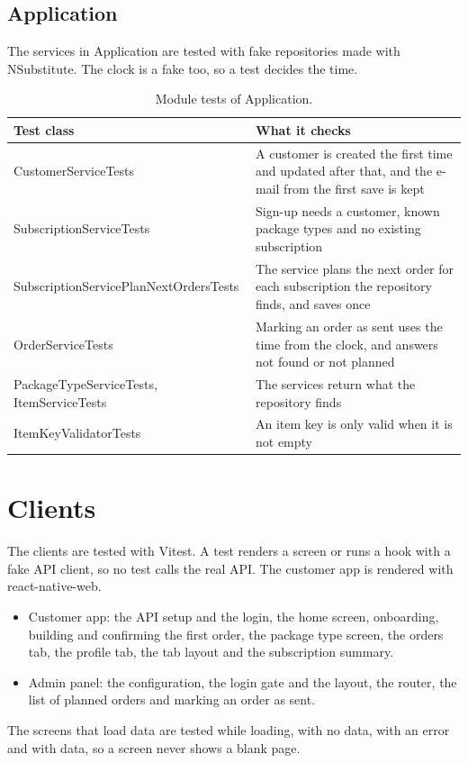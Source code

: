 \documentclass[a4paper,11pt]{article}
\begin{document}
\subsection{Application}
The services in Application are tested with fake repositories made with NSubstitute. The clock is a fake too, so a test decides the time.

\begin{table}[H]
\centering
\small
\begin{tabular}{@{}p{7.1cm}p{7.1cm}@{}}
\hline
\textbf{Test class} & \textbf{What it checks} \\
\hline
CustomerServiceTests & A customer is created the first time and updated after that, and the e-mail from the first save is kept \\
SubscriptionServiceTests & Sign-up needs a customer, known package types and no existing subscription \\
SubscriptionServicePlanNextOrdersTests & The service plans the next order for each subscription the repository finds, and saves once \\
OrderServiceTests & Marking an order as sent uses the time from the clock, and answers not found or not planned \\
PackageTypeServiceTests, ItemServiceTests & The services return what the repository finds \\
ItemKeyValidatorTests & An item key is only valid when it is not empty \\
\hline
\end{tabular}
\caption{Module tests of Application.}
\end{table}

\section{Clients}
The clients are tested with Vitest. A test renders a screen or runs a hook with a fake API client, so no test calls the real API. The customer app is rendered with react-native-web.

\begin{itemize}
  \item Customer app: the API setup and the login, the home screen, onboarding, building and confirming the first order, the package type screen, the orders tab, the profile tab, the tab layout and the subscription summary.
  \item Admin panel: the configuration, the login gate and the layout, the router, the list of planned orders and marking an order as sent.
\end{itemize}

The screens that load data are tested while loading, with no data, with an error and with data, so a screen never shows a blank page.
\end{document}
